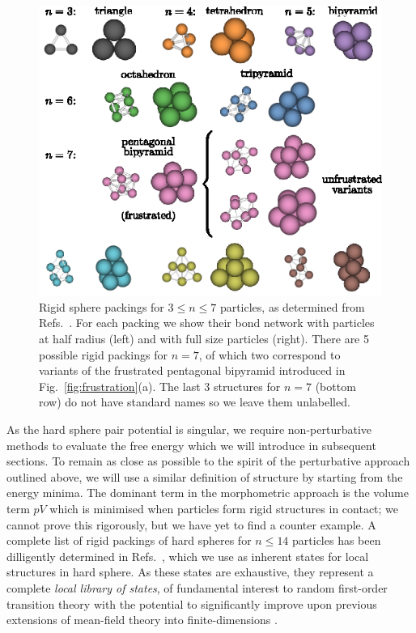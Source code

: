 \documentclass[11pt,twoside]{report}
\begin{document}
\begin{figure}
  \includegraphics[width=0.9\linewidth,outer]{packings}
  \caption[Rigid spherical packings of up to 7 particles]{
    Rigid sphere packings for $3 \le n \le 7$ particles, as determined from Refs.\ \cite{ArkusPRL2009,Holmes-CerfonSR2016}.
    For each packing we show their bond network with particles at half radius (left) and with full size particles (right).
    There are 5 possible rigid packings for $n=7$, of which two correspond to variants of the frustrated pentagonal bipyramid introduced in Fig.\ \ref{fig:frustration}(a).
    The last 3 structures for $n=7$ (bottom row) do not have standard names so we leave them unlabelled.
  }
  \label{fig:packings}
\end{figure}

As the hard sphere pair potential is singular, we require non-perturbative methods to evaluate the free energy which we will introduce in subsequent sections.
To remain as close as possible to the spirit of the perturbative approach outlined above, we will use a similar definition of structure by starting from the energy minima.
The dominant term in the morphometric approach is the volume term $pV$ which is minimised when particles form rigid structures in contact; we cannot prove this rigorously, but we have yet to find a counter example.
A complete list of rigid packings of hard spheres for $n \le 14$ particles has been dilligently determined in Refs.\ \cite{ArkusPRL2009,Holmes-CerfonSR2016}, which we use as inherent states for local structures in hard sphere.
As these states are exhaustive, they represent a complete \emph{local library of states}, of fundamental interest to random first-order transition theory \cite{LubchenkoARPC2007} with the potential to significantly improve upon previous extensions of mean-field theory into finite-dimensions \cite{BouchaudJCP2004,DzeroPRB2005,FranzJSM2005,AngeliniJSP2017,RulquinJSM2016,BiroliMeanPRB2018,BiroliFinitePRB2018}.
\end{document}
